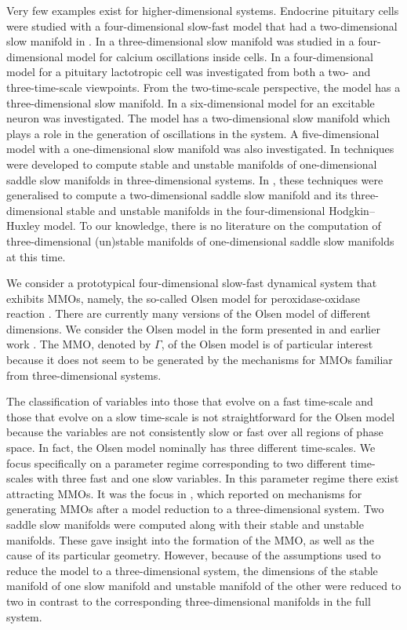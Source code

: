 \documentclass{ws-ijbc}
\begin{document}
Very few examples exist for higher-dimensional systems.  Endocrine pituitary cells were studied with a four-dimensional slow-fast model that had a two-dimensional slow manifold in \cite{Vo_paper2}.  In \cite{Emily_Harvey_paper} a three-dimensional slow manifold was studied in a four-dimensional model for calcium oscillations inside cells. In \cite{Vo_paper} a four-dimensional model for a pituitary lactotropic cell was investigated from both a two- and three-time-scale viewpoints.  From the two-time-scale perspective, the model has a three-dimensional slow manifold.  In \cite{Martin_neuron_paper} a six-dimensional model for an excitable neuron was investigated.  The model has a two-dimensional slow manifold which plays a role in the generation of oscillations in the system.  A five-dimensional model with a one-dimensional slow manifold was also investigated.  In \cite{Saeed_Paper} techniques were developed to compute stable and unstable manifolds of one-dimensional saddle slow manifolds in three-dimensional systems. In \cite{Cris_paper}, these techniques were generalised to compute a two-dimensional saddle slow manifold and its three-dimensional stable and unstable manifolds in the four-dimensional Hodgkin--Huxley model.  To our knowledge, there is no literature on the computation of three-dimensional (un)stable manifolds of one-dimensional saddle slow manifolds at this time.

We consider a prototypical four-dimensional slow-fast dynamical system that exhibits MMOs, namely, the so-called Olsen model for peroxidase-oxidase reaction \cite{Olsen}.  There are currently many versions of the Olsen model of different dimensions.  We consider the Olsen model in the form presented in \cite{Rescaling} and earlier work \cite{Rescaling_earlier_work}.  The MMO, denoted by $\Gamma$, of the Olsen model is of particular interest because it does not seem to be generated by the mechanisms for MMOs familiar from three-dimensional systems.

The classification of variables into those that evolve on a fast time-scale and those that evolve on a slow time-scale is not straightforward for the Olsen model because the variables are not consistently slow or fast over all regions of phase space.  In fact, the Olsen model nominally has three different time-scales.  We focus specifically on a parameter regime corresponding to two different time-scales with three fast and one slow variables.  In this parameter regime there exist attracting MMOs.  It was the focus in \cite{QSSA}, which reported on mechanisms for generating MMOs after a model reduction to a three-dimensional system.  Two saddle slow manifolds were computed along with their stable and unstable manifolds.  These gave insight into the formation of the MMO, as well as the cause of its particular geometry.  However, because of the assumptions used to reduce the model to a three-dimensional system, the dimensions of the stable manifold of one slow manifold and unstable manifold of the other were reduced to two in contrast to the corresponding three-dimensional manifolds in the full system.  
\end{document}
